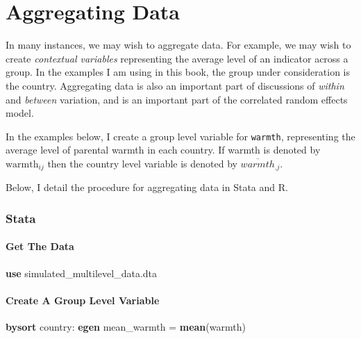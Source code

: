 \documentclass[
  letterpaper,
  DIV=11,
  numbers=noendperiod]{scrreprt}
\newenvironment{Shaded}{\begin{snugshade}}{\end{snugshade}}
\newcommand{\KeywordTok}[1]{\textcolor[rgb]{0.00,0.23,0.31}{\textbf{#1}}}
\newcommand{\NormalTok}[1]{\textcolor[rgb]{0.00,0.23,0.31}{#1}}
\begin{document}
\chapter{Aggregating Data}\label{aggregating-data}

In many instances, we may wish to aggregate data. For example, we may
wish to create \emph{contextual variables} representing the average
level of an indicator across a group. In the examples I am using in this
book, the group under consideration is the country. Aggregating data is
also an important part of discussions of \emph{within} and
\emph{between} variation, and is an important part of the correlated
random effects model.

In the examples below, I create a group level variable for
\texttt{warmth}, representing the average level of parental warmth in
each country. If warmth is denoted by \(\text{warmth}_{ij}\) then the
country level variable is denoted by \(\overline{warmth}_{.j}\).

Below, I detail the procedure for aggregating data in Stata and R.

\subsection{Stata}

\subsubsection{Get The Data}\label{get-the-data-14}

\begin{Shaded}
\begin{Highlighting}[]

\KeywordTok{use}\NormalTok{ simulated\_multilevel\_data.dta}
\end{Highlighting}
\end{Shaded}

\subsubsection{Create A Group Level
Variable}\label{create-a-group-level-variable}

\begin{Shaded}
\begin{Highlighting}[]

\KeywordTok{bysort}\NormalTok{ country: }\KeywordTok{egen}\NormalTok{ mean\_warmth = }\KeywordTok{mean}\NormalTok{(warmth)}
\end{Highlighting}
\end{Shaded}
\end{document}
